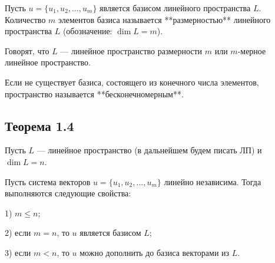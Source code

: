 {Пусть \( u = \{ u_1, u_2, \ldots, u_m \} \) является базисом линейного пространства \( L \). Количество \( m \) элементов базиса называется **размерностью** линейного пространства \( L \) (обозначение: \( \dim L = m \)).

Говорят, что \( L \) — линейное пространство размерности \( m \) или \( m \)-мерное линейное пространство.

Если не существует базиса, состоящего из конечного числа элементов, пространство называется **бесконечномерным**.

\subsection*{Теорема 1.4}

Пусть \( L \) — линейное пространство (в дальнейшем будем писать ЛП) и \( \dim L = n \).

Пусть система векторов \( u = \{ u_1, u_2, \ldots, u_m \} \) линейно независима. Тогда выполняются следующие свойства:

1) \( m \leq n \);

2) если \( m = n \), то \( u \) является базисом \( L \);

3) если \( m < n \), то \( u \) можно дополнить до базиса векторами из \( L \).


}